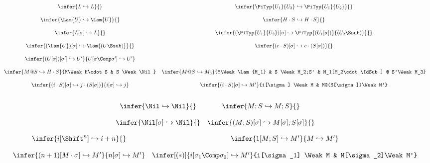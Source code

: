 \bigskip 
{}
\bigskip 

$$
\begin{array}{cc}
\infer{L \Weak L}{} &
\infer{\PiTyp{U_1}{U_2} \Weak \PiTyp{U_1}{U_2}}{} \\\\
\infer{\Lam{U} \Weak \Lam{U}}{} &
\infer{H\cdot S \Weak H\cdot S}{} \\\\
\infer{L[\sigma] \Weak L}{}&
\infer{(\PiTyp{U_1}{U_2})[\sigma] \Weak \PiTyp{(U_1[\sigma])}{(U_2\Ssub)}}{} \\\\
\infer{(\Lam{U})[\sigma] \Weak \Lam{(U\Ssub)}}{} &
\infer{(c\cdot S)[\sigma] \Weak c\cdot (S[\sigma])}{} \\\\
\infer{(U[\sigma])[\sigma'] \Weak U'}{U[\sigma\Comp\sigma']\Weak U'} \\\\
\infer{M @ S \Weak H\cdot S}{M\Weak H\cdot S & S \Weak \Nil} &
\infer{M @ S \Weak M_3}{M\Weak \Lam{M_1} & S \Weak M_2;S' & M_1[M_2\cdot\IdSub] @ S'\Weak M_3} \\\\
\infer{(i\cdot S)[\sigma]\Weak j\cdot (S[\sigma])}{i[\sigma] \Weak j} &
\infer{(i\cdot S)[\sigma]\Weak M'}{i[\sigma] \Weak M & M@(S[\sigma])\Weak M'} \\\\
\end{array} 
$$

\bigskip 
{}
\bigskip 

$$
\begin{array}{cc}
\infer{\Nil \Weak \Nil}{} &
\infer{M;S \Weak M;S}{} \\\\
\infer{\Nil[\sigma] \Weak \Nil}{} &
\infer{(M;S)[\sigma] \Weak M[\sigma];S[\sigma]}{} 
\end{array} 
$$

\bigskip 
{}
\bigskip 

$$
\begin{array}{cc}
\infer{i[\Shift^n] \Weak i + n}{} &
\infer{1[M;S] \Weak M'}{M\Weak M'} \\\\
\infer{(n+1)[M\cdot \sigma] \Weak M'}{n[\sigma]\Weak M'} &
\infer[(*)]{i[\sigma_1\Comp\sigma_2] \Weak M'}{i[\sigma_1] \Weak M & M[\sigma_2]\Weak M'} 
\end{array} 
$$



